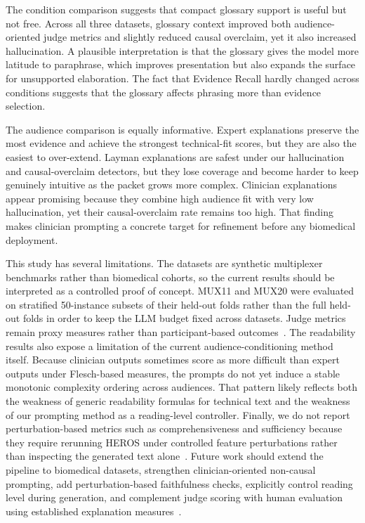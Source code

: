 \documentclass[sigconf,nonacm]{acmart}
\begin{document}
The condition comparison suggests that compact glossary support is useful but not free. Across all three datasets, glossary context improved both audience-oriented judge metrics and slightly reduced causal overclaim, yet it also increased hallucination. A plausible interpretation is that the glossary gives the model more latitude to paraphrase, which improves presentation but also expands the surface for unsupported elaboration. The fact that Evidence Recall hardly changed across conditions suggests that the glossary affects phrasing more than evidence selection.

The audience comparison is equally informative. Expert explanations preserve the most evidence and achieve the strongest technical-fit scores, but they are also the easiest to over-extend. Layman explanations are safest under our hallucination and causal-overclaim detectors, but they lose coverage and become harder to keep genuinely intuitive as the packet grows more complex. Clinician explanations appear promising because they combine high audience fit with very low hallucination, yet their causal-overclaim rate remains too high. That finding makes clinician prompting a concrete target for refinement before any biomedical deployment.

This study has several limitations. The datasets are synthetic multiplexer benchmarks rather than biomedical cohorts, so the current results should be interpreted as a controlled proof of concept. MUX11 and MUX20 were evaluated on stratified 50-instance subsets of their held-out folds rather than the full held-out folds in order to keep the LLM budget fixed across datasets. Judge metrics remain proxy measures rather than participant-based outcomes~\cite{liu2023geval,huang2025judge}. The readability results also expose a limitation of the current audience-conditioning method itself. Because clinician outputs sometimes score as more difficult than expert outputs under Flesch-based measures, the prompts do not yet induce a stable monotonic complexity ordering across audiences. That pattern likely reflects both the weakness of generic readability formulas for technical text and the weakness of our prompting method as a reading-level controller. Finally, we do not report perturbation-based metrics such as comprehensiveness and sufficiency because they require rerunning HEROS under controlled feature perturbations rather than inspecting the generated text alone~\cite{deyoung2020eraser}. Future work should extend the pipeline to biomedical datasets, strengthen clinician-oriented non-causal prompting, add perturbation-based faithfulness checks, explicitly control reading level during generation, and complement judge scoring with human evaluation using established explanation measures~\cite{hoffman2023measures,holzinger2020scs}.
\end{document}
